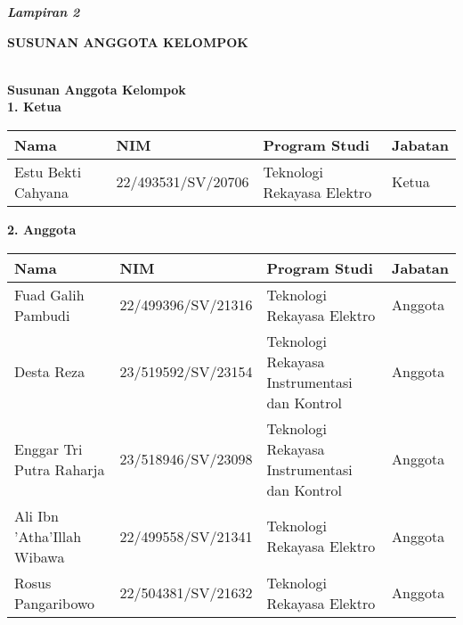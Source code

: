 \setcounter{section}{0} %
\renewcommand{\thesection}{\Alph{section}}
\renewcommand{\thesubsection}{\arabic{subsection}}

\textbf{\textit{Lampiran 2}}\\

\begin{center}
        \textbf{\MakeUppercase{\large{susunan anggota kelompok}}}\\
        \textbf{\MakeUppercase{\normalsize{\judulproyek}}}\\[1cm]
\end{center}

\textbf{\large{Susunan Anggota Kelompok}}\\[0.5cm]
\noindent \textbf{1. Ketua}

\begin{tabular}{|m{4cm}|m{4cm}|m{3cm}|m{3cm}|} 
    \hline
    \textbf{Nama} & \textbf{NIM} & \textbf{Program Studi} & \textbf{Jabatan} \\ 
    \hline
     Estu Bekti Cahyana& 22/493531/SV/20706 & Teknologi Rekayasa Elektro& Ketua \\ 
    \hline
\end{tabular}

\vspace{0.5cm}

\noindent \textbf{2. Anggota}

\begin{tabular}{|m{4cm}|m{4cm}|m{3cm}|m{3cm}|} 
    \hline
    \textbf{Nama} & \textbf{NIM} & \textbf{Program Studi} & \textbf{Jabatan} \\ 
    \hline
     Fuad Galih Pambudi & 22/499396/SV/21316 & Teknologi Rekayasa Elektro & Anggota \\ 
    \hline
    Desta Reza & 23/519592/SV/23154 & Teknologi Rekayasa Instrumentasi dan Kontrol & Anggota\\\hline
    Enggar Tri Putra Raharja & 23/518946/SV/23098 & Teknologi Rekayasa Instrumentasi dan Kontrol & Anggota\\\hline
    Ali Ibn 'Atha'Illah Wibawa & 22/499558/SV/21341 & Teknologi Rekayasa Elektro& Anggota\\\hline
    Rosus Pangaribowo & 22/504381/SV/21632 & Teknologi Rekayasa Elektro & Anggota\\\hline
\end{tabular}

